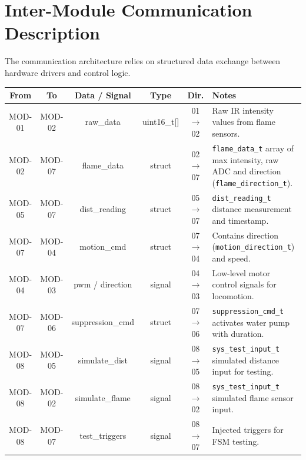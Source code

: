 \documentclass[12pt]{article}
\begin{document}
\section{Inter-Module Communication Description}

The communication architecture relies on structured data exchange between hardware drivers and control logic.

\begin{center}
\begin{tabular}{|c|c|c|c|c|p{5cm}|}
\hline
\textbf{From} & \textbf{To} & \textbf{Data / Signal} & \textbf{Type} & \textbf{Dir.} & \textbf{Notes} \\
\hline

MOD-01 & MOD-02 & raw\_data & uint16\_t[] & 01 $\rightarrow$ 02 & Raw IR intensity values from flame sensors. \\
\hline

MOD-02 & MOD-07 & flame\_data & struct & 02 $\rightarrow$ 07 & \texttt{flame\_data\_t} array of max intensity, raw ADC and direction (\texttt{flame\_direction\_t}). \\
\hline

MOD-05 & MOD-07 & dist\_reading & struct & 05 $\rightarrow$ 07 & \texttt{dist\_reading\_t} distance measurement and timestamp. \\
\hline

MOD-07 & MOD-04 & motion\_cmd & struct & 07 $\rightarrow$ 04 & Contains direction (\texttt{motion\_direction\_t}) and speed. \\
\hline

MOD-04 & MOD-03 & pwm / direction & signal & 04 $\rightarrow$ 03 & Low-level motor control signals for locomotion. \\
\hline

MOD-07 & MOD-06 & suppression\_cmd & struct & 07 $\rightarrow$ 06 & \texttt{suppression\_cmd\_t} activates water pump with duration. \\
\hline

MOD-08 & MOD-05 & simulate\_dist & signal & 08 $\rightarrow$ 05 & \texttt{sys\_test\_input\_t} simulated distance input for testing. \\
\hline

MOD-08 & MOD-02 & simulate\_flame & signal & 08 $\rightarrow$ 02 & \texttt{sys\_test\_input\_t} simulated flame sensor input. \\
\hline

MOD-08 & MOD-07 & test\_triggers & signal & 08 $\rightarrow$ 07 & Injected triggers for FSM testing. \\
\hline

\end{tabular}
\end{center}
\end{document}
